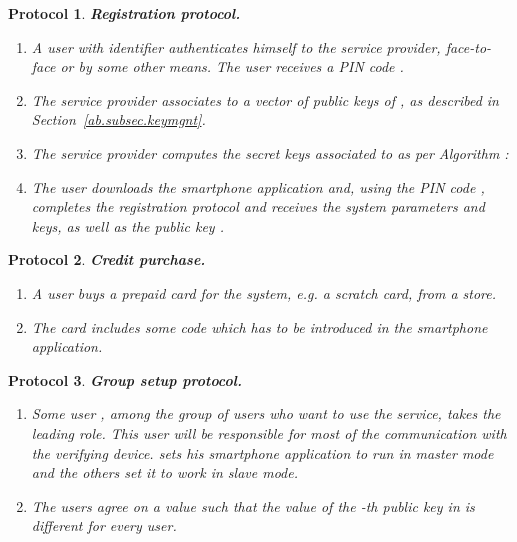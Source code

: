 \documentclass[11pt]{llncs}
\newtheorem{proto}{Protocol}
\begin{document}
\begin{proto}
\textbf{Registration protocol.}
\begin{enumerate}
\item A user  with identifier  authenticates
himself to the service provider, face-to-face or by some other
means. The user receives a PIN code .
\item The service provider associates to  a vector of public keys of ,
 as described in Section~\ref{ab.subsec.keymgnt}.
\item The service provider computes the secret keys
associated to 
as per Algorithm :

\item The user downloads the smartphone application  and, using
the PIN code , completes the registration protocol and
receives the system parameters and keys, as well as the
public key .
\end{enumerate}
\end{proto}

\begin{proto}
\textbf{Credit purchase.}
\begin{enumerate}
\item A user buys a prepaid card for the system, \emph{e.g}. a scratch card,
from a store.
\item The card includes some code  which has to be
introduced in the smartphone application.
\end{enumerate}
\end{proto}

\begin{proto}\label{ab.proto.gsetup}
\textbf{Group setup protocol.}
\begin{enumerate}
\item Some user , among the group of users  who want
to use the service, takes the leading role. This user
will be responsible for most of the
communication with the verifying device.  sets his smartphone
application to run in master mode and the others set it to work in slave mode.
\item The users agree on a value  such that the
value of the -th public key in  is different for every user.
\end{enumerate}
\end{proto}
\end{document}
